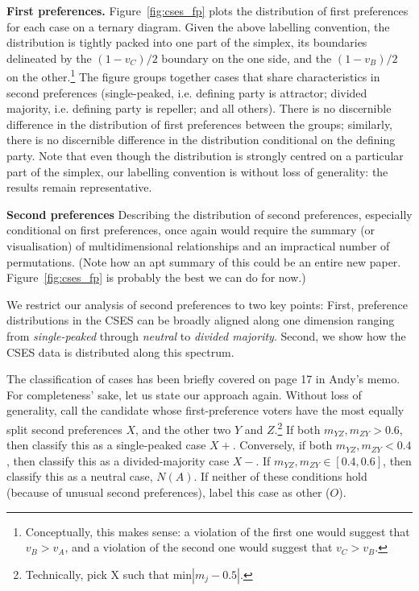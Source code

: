 \documentclass[11pt, letter]{article}
\begin{document}
\textbf{First preferences.} Figure~\ref{fig:cses_fp} plots the distribution of first preferences for each case on a ternary diagram. Given the above labelling convention, the distribution is tightly packed into one part of the simplex, its boundaries delineated by the $(1 - v_C) / 2$ boundary on the one side, and the $(1 - v_B) / 2$ on the other.\footnote{Conceptually, this makes sense: a violation of the first one would suggest that $v_B > v_A$, and a violation of the second one would suggest that $v_C > v_B$.} The figure groups together cases that share characteristics in second preferences (single-peaked, i.e. defining party is attractor; divided majority, i.e. defining party is repeller; and all others). There is no discernible difference in the distribution of first preferences between the groups; similarly, there is no discernible difference in the distribution conditional on the defining party. Note that even though the distribution is strongly centred on a particular part of the simplex, our labelling convention is without loss of generality: the results remain representative.

\textbf{Second preferences }Describing the distribution of second preferences, especially conditional on first preferences, once again would require the summary (or visualisation) of multidimensional relationships and an impractical number of permutations. (Note how an apt summary of this could be an entire new paper. Figure~\ref{fig:cses_fp} is probably the best we can do for now.)

We restrict our analysis of second preferences to two key points: First, preference distributions in the CSES can be broadly aligned along one dimension ranging from \emph{single-peaked} through \emph{neutral} to \emph{divided majority}. Second, we show how the CSES data is distributed along this spectrum.

The classification of cases has been briefly covered on page 17 in Andy's memo. For completeness' sake, let us state our approach again. Without loss of generality, call the candidate whose first-preference voters have the most equally split second preferences $X$, and the other two $Y$ and $Z$.\footnote{Technically, pick X such that $\mathrm{min} |m_j - 0.5|$.} If both $m_{YZ}, m_{ZY} > 0.6$, then classify this as a single-peaked case $X+$. Conversely, if both $m_{YZ}, m_{ZY} < 0.4$, then classify this as a divided-majority case $X-$. If $m_{YZ}, m_{ZY} \in [0.4, 0.6]$, then classify this as a neutral case, $N(A)$. If neither of these conditions hold (because of unusual second preferences), label this case as other ($O$). 
\end{document}
